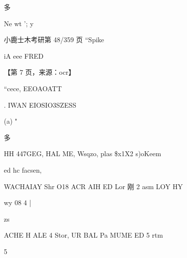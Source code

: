 \documentclass[UTF8,12pt,a4paper,openany]{ctexbook}
\begin{document}
\begin{enumerate}[label=\textbf{\arabic*.},leftmargin=2em]
  多\par Ne wt '; y\par 小鹿士木考研第 48/359 页                            “Spike\par iA eee FRED\par \par 【第 7 页，来源：ocr】\par “cece, EEOAOATT\par .            IWAN EIOSIO3SZESS\par (a)                 "\par 多\par HH 447GEG, HAL ME, Wsqzo, plas \$x1X2 s)oKeem\par ed    hc facsen,\par WACHAIAY Shr O18 ACR AIH ED Lor 刚 2 asm LOY HY\par wy 08 4             |\par zs\par ACHE H ALE 4 Stor, UR BAL Pa MUME ED 5 rtm\par 5     
\end{enumerate}
\end{document}
